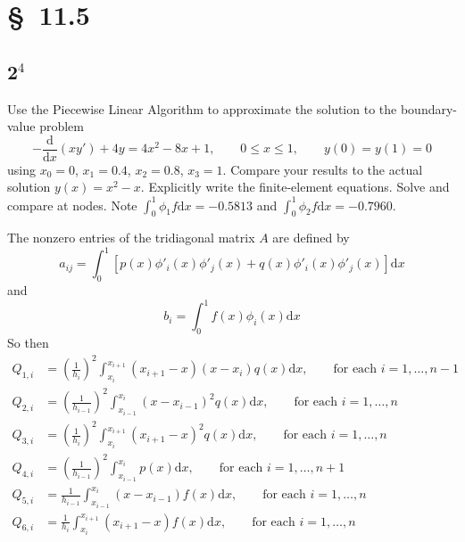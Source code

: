 \documentclass[12pt]{article}
\newcommand{\dd}[1]{\mathrm{d}{#1}}
\newcommand{\ddt}[1]{\frac{\dd{}}{\dd{#1}}}
\begin{document}
\section{\S~11.5}
\subsection{2$^4$}
Use the Piecewise Linear Algorithm to approximate the solution to the
boundary-value problem 
$$ -\ddt{x}(xy')+4y=4x^2-8x+1,\qquad 0\leq x\leq1,\qquad
y(0)=y(1)=0 $$ using $x_0=0$, $x_1=0.4$, $x_2=0.8$, $x_3=1$. Compare
your results to the actual solution $y(x)=x^2-x$. Explicitly write the
finite-element equations. Solve and compare at nodes. Note $\int_0^1\phi_1 f
\dd{x} = -0.5813$ and $\int_0^1\phi_2 f \dd{x} = -0.7960$.

The nonzero entries of the tridiagonal matrix $A$ are defined by 
\begin{equation}
  \label{eq:piecewise-general-a}
  a_{ij} = \int_0^1[p(x)\phi'_i(x)\phi'_j(x)+q(x)\phi'_i(x)\phi'_j(x)]\dd{x}
\end{equation}
and
\begin{equation}
  \label{eq:piecewise-general-b}
  b_i = \int_0^1f(x)\phi_i(x)\dd{x}
\end{equation}
So then 
\begin{equation}
  \begin{aligned}
    Q_{1,i}&=\left(\frac{1}{h_{i}}\right)^2\int_{x_i}^{x_{i+1}}(x_{i+1}-x)(x-x_{i})q(x)\dd{x},
    \qquad \text{for each }i=1,\ldots,n-1 \\
    Q_{2,i}&=\left(\frac{1}{h_{i-1}}\right)^2\int_{x_{i-1}}^{x_{i}}(x-x_{i-1})^2q(x)\dd{x},
    \qquad \text{for each }i=1,\ldots,n \\
    Q_{3,i}&=\left(\frac{1}{h_{i}}\right)^2\int_{x_i}^{x_{i+1}}(x_{i+1}-x)^2q(x)\dd{x},
    \qquad \text{for each }i=1,\ldots,n \\
    Q_{4,i}&=\left(\frac{1}{h_{i-1}}\right)^2\int_{x_{i-1}}^{x_{i}}p(x)\dd{x},
    \qquad \text{for each }i=1,\ldots,n+1 \\
    Q_{5,i}&=\frac{1}{h_{i-1}}\int_{x_{i-1}}^{x_{i}}(x-x_{i-1})f(x)\dd{x},
    \qquad \text{for each }i=1,\ldots,n \\
    Q_{6,i}&=\frac{1}{h_{i}}\int_{x_i}^{x_{i+1}}(x_{i+1}-x)f(x)\dd{x},
    \qquad \text{for each }i=1,\ldots,n \\
  \end{aligned}
\end{equation}
\end{document}
